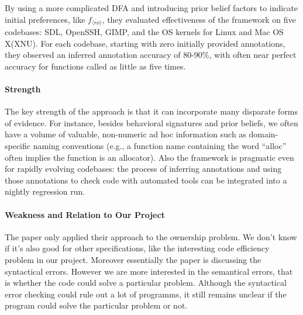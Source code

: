By using a more complicated DFA and introducing prior belief factors to indicate initial preferences, like $f_{\langle ro \rangle}$, they evaluated effectiveness of the framework on five codebases: SDL, OpenSSH, GIMP, and the OS kernels for Linux and Mac OS X(XNU). For each codebase, starting with zero initially provided annotations, they observed an inferred annotation accuracy of 80-90\%, with often near perfect accuracy for functions called as little as five times.

\paragraph{Strength}
The key strength of the approach is that it can incorporate many disparate forms of evidence. For instance, besides behavioral signatures and prior beliefs, we often have a volume of valuable, non-numeric ad hoc information such as domain-specific naming conventions (e.g., a function name containing the word ``alloc'' often implies the function is an allocator). Also the framework is pragmatic even for rapidly evolving codebases: the process of inferring annotations and using those annotations to check code with automated tools can be integrated into a nightly regression run. 

\paragraph{Weakness and Relation to Our Project}
The paper only applied their approach to the ownership problem. We don't know if it's also good for other specifications, like the interesting code efficiency problem in our project. Moreover essentially the paper is discussing the syntactical errors. However we are more interested in the semantical errors, that is whether the code could solve a particular problem. Although the syntactical error checking could rule out a lot of programms, it still remains unclear if the program could solve the particular problem or not. 
